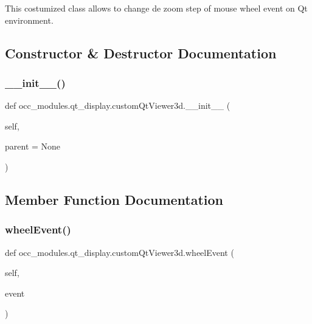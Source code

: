 This costumized class allows to change de zoom step of mouse wheel event on Qt environment. 

\subsection{Constructor \& Destructor Documentation}
\hypertarget{a00090_aeef3c40364ac364d1ffc5ba3f5122964}{}\label{a00090_aeef3c40364ac364d1ffc5ba3f5122964} 
\subsubsection{\texorpdfstring{\+\_\+\+\_\+init\+\_\+\+\_\+()}{\_\_init\_\_()}}
{\footnotesize\ttfamily def occ\+\_\+modules.\+qt\+\_\+display.\+custom\+Qt\+Viewer3d.\+\_\+\+\_\+init\+\_\+\+\_\+ (\begin{DoxyParamCaption}\item[{}]{self,  }\item[{}]{parent = {\ttfamily None} }\end{DoxyParamCaption})}



\subsection{Member Function Documentation}
\hypertarget{a00090_a2031b7d19b3a0c4b0f54fc90218bcdd8}{}\label{a00090_a2031b7d19b3a0c4b0f54fc90218bcdd8} 
\subsubsection{\texorpdfstring{wheel\+Event()}{wheelEvent()}}
{\footnotesize\ttfamily def occ\+\_\+modules.\+qt\+\_\+display.\+custom\+Qt\+Viewer3d.\+wheel\+Event (\begin{DoxyParamCaption}\item[{}]{self,  }\item[{}]{event }\end{DoxyParamCaption})}



